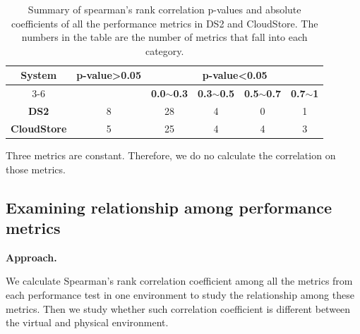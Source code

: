 \begin{table}[tbh]
	\centering
	\caption{Summary of spearman's rank correlation p-values and absolute coefficients of all the performance metrics in DS2 and CloudStore. The numbers in the table are the number of metrics that fall into each category.}
	\label{tab:correlationall}
	\begin{threeparttable}
  
		\begin{tabular}{|c||c|c|c|c|c|}
			\hline
			\multirow{3}{*}{\textbf{System}} & \multirow{3}{*}{\textbf{p-value\textgreater0.05}} & \multicolumn{4}{c|}{\textbf{p-value\textless0.05}} \\ \cline{3-6} 
			&  & \textbf{0.0$\sim$0.3} & \textbf{0.3$\sim$0.5} & \textbf{0.5$\sim$0.7} & \textbf{0.7$\sim$1} \\ %
			\midrule 
			\midrule 
			\textbf{DS2} & 8 & 28 & 4 & 0 & 1 \\ \hline
			\textbf{CloudStore} & 5 & 25 & 4 & 4 & 3 \\ \hline
		\end{tabular}%
		\begin{tablenotes}
			\item Three metrics are constant. Therefore, we do no calculate the correlation on those metrics.
		\end{tablenotes}
		\end{threeparttable}
	  
\end{table}



\subsection{Examining relationship among performance metrics}


\noindent \textbf{Approach.} 

We calculate Spearman's rank correlation coefficient among all the metrics from each performance test in one environment to study the relationship among these metrics. Then we study whether such correlation coefficient is different between the virtual and physical environment. 

